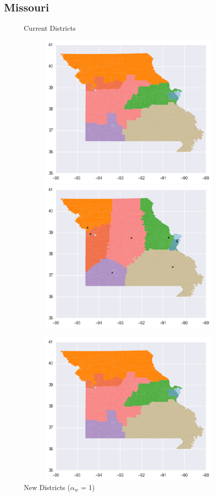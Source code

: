 \clearpage
\newpage

\subsection{Missouri}
\begin{figure}[htb!] \centering
\caption{ Current Districts }
\includegraphics[width=5in,height=3in,keepaspectratio]{../maps/MO/static/before.png}
\includegraphics[width=5in,height=3in,keepaspectratio]{../maps/MO/static/0_0_after.png}
\caption{ New Districts ($\alpha_w$ = 1) }
\includegraphics[width=5in,height=3in,keepaspectratio]{../maps/MO/static/before.png}

\end{figure}
